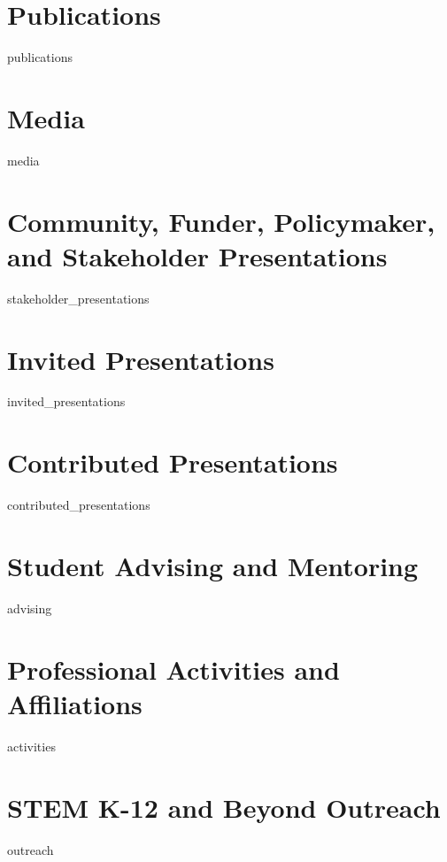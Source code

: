 \documentclass[11pt, letterpaper, roman]{moderncv} %
\begin{document}
\newpage
\section{Publications}
{publications}

\section{Media}
{media}

\section{Community, Funder, Policymaker, and Stakeholder Presentations}
{stakeholder_presentations}

\section{Invited Presentations}
{invited_presentations}

\vspace{-5pt}
\section{Contributed Presentations}
{contributed_presentations}

\newpage
\section{Student Advising and Mentoring}
{advising}

\section{Professional Activities and Affiliations}
{activities}

\section{STEM K-12 and Beyond Outreach}
{outreach}
\end{document}
